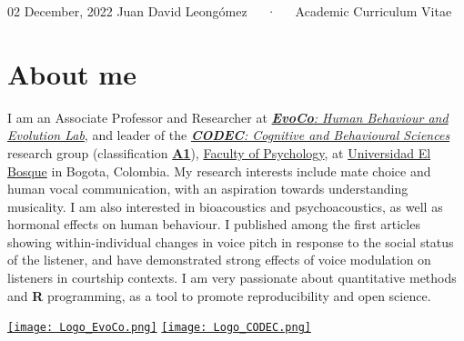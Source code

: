 \documentclass[11pt,a4paper,]{awesome-cv}
\begin{document}
\makecvheader

\makecvfooter
  {02 December, 2022}
    {Juan David Leongómez~~~·~~~Academic Curriculum Vitae}
  {\thepage}





\hypertarget{about-me}{%
\section{About me}\label{about-me}}

\begin{minipage}[c]{0.85\linewidth}
I am an Associate Professor and Researcher at \href{https://jdleongomez.info/en/team/}{\textit{\textbf{EvoCo}: Human Behaviour and Evolution Lab}}, and leader of the \href{https://investigaciones.unbosque.edu.co/codec}{\textit{\textbf{CODEC}: Cognitive and Behavioural Sciences}} research group (classification \href{https://scienti.minciencias.gov.co/gruplac/jsp/visualiza/visualizagr.jsp?nro=00000000001446}{\textbf{A1}}), \href{https://www.uelbosque.edu.co/psicologia}{Faculty of Psychology}, at \href{https://www.uelbosque.edu.co/}{Universidad El Bosque} in Bogota, Colombia. My research interests include mate choice and human vocal communication, with an aspiration towards understanding musicality. I am also interested in bioacoustics and psychoacoustics, as well as hormonal effects on human behaviour. I published among the first articles showing within-individual changes in voice pitch in response to the social status of the listener, and have demonstrated strong effects of voice modulation on listeners in courtship contexts. I am very passionate about quantitative methods and \textbf{R} programming, as a tool to promote reproducibility and open science.
\end{minipage} \begin{minipage}[c]{0.15\linewidth}
\begin{flushright} 
\hfill \href{https://jdleongomez.info/es/team/}{\texttt{[image: Logo\_EvoCo.png]}} \newline \href{https://investigaciones.unbosque.edu.co/codec}{\texttt{[image: Logo\_CODEC.png]}}
\end{flushright}
\end{minipage}
\end{document}
